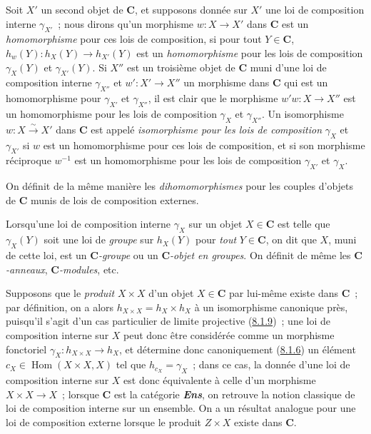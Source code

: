 \begin{env}[8.2.2]
\label{0.8.2.2-fr}
Soit $X'$ un second objet de $\boldsymbol{C}$, et supposons donnée sur $X'$ une loi de
composition interne $\gamma_{X'}$~; nous dirons qu'un morphisme
$w:X\to X'$ dans $\boldsymbol{C}$ est un \emph{homomorphisme} pour ces lois de
composition, si pour tout $Y\in\boldsymbol{C}$, $h_w(Y):h_X(Y)\to h_{X'}(Y)$ est un
\emph{homomorphisme} pour les lois de composition $\gamma_X(Y)$ et
$\gamma_{X'}(Y)$. Si $X''$ est un troisième
objet de $\boldsymbol{C}$ muni d'une loi de composition interne $\gamma_{X''}$ et
$w':X'\to X''$ un morphisme dans $\boldsymbol{C}$ qui est un homomorphisme pour
$\gamma_{X'}$ et $\gamma_{X''}$, il est clair que le morphisme
$w'w:X\to X''$ est un homomorphisme pour les lois de composition $\gamma_X$
et $\gamma_{X''}$. Un isomorphisme $w:X\xrightarrow{\sim}X'$ dans $\boldsymbol{C}$ est
appelé \emph{isomorphisme pour les lois de composition} $\gamma_X$ et
$\gamma_{X'}$ si $w$ est un homomorphisme pour ces lois de composition, et
si son morphisme réciproque $w^{-1}$ est un homomorphisme pour les lois de
composition $\gamma_{X'}$ et $\gamma_X$.

On définit de la même manière les \emph{dihomomorphismes} pour les couples
d'objets de $\boldsymbol{C}$ munis de lois de composition externes.
\end{env}

\begin{env}[8.2.3]
\label{0.8.2.3-fr}
Lorsqu'une loi de composition interne $\gamma_X$ sur un objet $X\in \boldsymbol{C}$ est
telle que $\gamma_X(Y)$ soit une loi de \emph{groupe} sur $h_X(Y)$ pour
\emph{tout} $Y\in \boldsymbol{C}$, on dit que $X$, muni de cette loi, est un
\emph{$\boldsymbol{C}$-groupe} ou un \emph{$\boldsymbol{C}$-objet en groupes}. On définit de même les
\emph{$\boldsymbol{C}$-anneaux}, \emph{$\boldsymbol{C}$-modules}, etc.
\end{env}

\begin{env}[8.2.4]
\label{0.8.2.4-fr}
Supposons que le \emph{produit} $X\times X$ d'un objet $X\in \boldsymbol{C}$ par lui-même
existe dans $\boldsymbol{C}$~; par définition, on a alors
$h_{X\times X}=h_X\times h_X$ à un isomorphisme canonique près, puisqu'il
s'agit d'un cas particulier de limite projective
(\hyperref[0.8.1.9-fr]{8.1.9})~; une loi de composition interne sur $X$ peut
donc être considérée comme un morphisme fonctoriel
$\gamma_X:h_{X\times X}\to h_X$, et détermine donc canoniquement
(\hyperref[0.8.1.6-fr]{8.1.6}) un élément
$c_X\in\operatorname{Hom}(X\times X,X)$ tel que $h_{c_X}=\gamma_X$~; dans
ce cas, la donnée d'une loi de composition interne sur $X$ est donc
équivalente à celle d'un morphisme $X\times X\to X$~; lorsque $\boldsymbol{C}$ est la
catégorie \textbf{\textit{Ens}}, on retrouve la notion classique de loi de
composition interne sur un ensemble. On a un résultat analogue pour une loi
de composition externe lorsque le produit $Z\times X$ existe dans $\boldsymbol{C}$.
\end{env}

